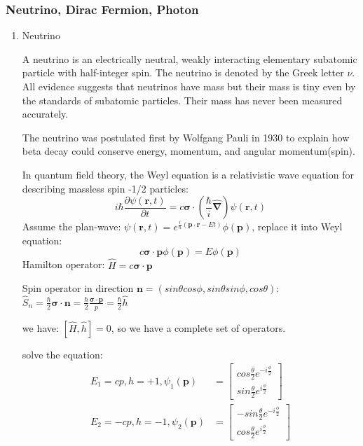\documentclass[12pt]{article}
\numberwithin{equation}{section}
\begin{document}
\subsubsection{Neutrino, Dirac Fermion, Photon}
\begin{enumerate}
\item Neutrino\par
	A neutrino is an electrically neutral, weakly interacting elementary subatomic particle with half-integer spin. The neutrino is denoted by the Greek letter $\nu$. All evidence suggests that neutrinos have mass but their mass is tiny even by the standards of subatomic particles. Their mass has never been measured accurately.\par
	The neutrino was postulated first by Wolfgang Pauli in 1930 to explain how beta decay could conserve energy, momentum, and angular momentum(spin).\par
	In quantum field theory, the Weyl equation is a relativistic wave equation for describing massless spin -1/2 particles:
	\begin{equation}
		i\hbar\frac{\partial \psi(\bm{r},t)}{\partial t}=
		c\bm{\sigma}\cdot(\frac{\hbar}{i}\hat{\bm{\nabla}})\psi(\bm{r},t)
	\end{equation}
	Assume the plan-wave: $\psi(\mathbf{r},t)=e^{\frac{i}{\hbar}(\bm{p} \cdot \bm{r}-Et)}\phi(\bm{p})$, replace it into Weyl equation:
	\begin{equation}
		c\bm{\sigma}\cdot\bm{p}\phi(\bm{p})=E\phi(\bm{p})
	\end{equation}
	Hamilton operator: $\hat{H}=c\bm{\sigma}\cdot\bm{p}$\par
	Spin operator in direction $\bm{n}=(sin\theta cos\phi, sin\theta sin\phi, cos\theta)$: 
	$\hat{S}_n=\frac{\hbar}{2}\bm{\sigma}\cdot\bm{n}
	=\frac{\hbar}{2}\frac{\bm{\sigma}\cdot\bm{p}}{p}=\frac{\hbar}{2}\hat{h}$ \par
	we have: $[\hat{H},\hat{h}]=0$, so we have a complete set of operators.\par
	solve the equation: 
	\begin{equation}\begin{split}
		E_1=cp, h=+1, \psi_1(\bm{p})&=\begin{bmatrix}cos\frac{\theta}{2}e^{-i\frac{\phi}{2}} \\ sin\frac{\theta}{2}e^{i\frac{\phi}{2}} \end{bmatrix}\\
		E_2=-cp, h=-1, \psi_2(\bm{p})&=\begin{bmatrix}-sin\frac{\theta}{2}e^{-i\frac{\phi}{2}} \\ cos\frac{\theta}{2}e^{i\frac{\phi}{2}} \end{bmatrix}

\end{split}
\end{equation}
\end{enumerate}
\end{document}
